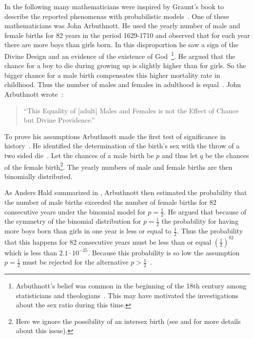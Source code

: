In the following many mathematicians were inspired by Graunt's book to describe the reported phenomenas with probabilistic models~\cite[p. 275]{hald1}. One of these mathematicians was John Arbuthnott. He used the yearly number of male and female births for 82 years in the period 1629-1710 and observed that for each year there are more boys than girls born. In this disproportion he saw a sign of the Divine Design and an evidence of the existence of God~\cite[p. 277]{hald1}\footnote{Arbuthnott's belief was common in the beginning of the 18th century among statisticians and theologians~\cite[p.~285]{hald1}. This may have motivated the investigations about the sex ratio during this time.}. He argued that the chance for a boy to die during growing up is slightly higher than for girls. So the bigger chance for a male birth compensates this higher mortality rate in childhood. Thus the number of males and females in adulthood is equal~\cite[p. 277]{hald1}. John Arbuthnott wrote~\cite[p. 275]{hald1}:

\begin{quote}
    ``This Equality of [adult] Males and Females is not the Effect of Chance but Divine Providence.''
\end{quote}

To prove his assumptions Arbuthnott made the first test of significance in history~\cite[p. 276]{hald1}. He identified the determination of the birth's sex with the throw of a two sided die~\cite[pp. 275-276]{hald1}. Let the chances of a male birth be $p$ and thus let $q$ be the chances of the female birth\footnote{Here we ignore the possibility of an intersex birth (see \cite{wiki:intersex} and \cite{wiki:transgender} for more details about this issue).}. The yearly numbers of male and female births are then binomially distributed.

As Anders Hald summarized in \cite[p. 278]{hald1}, Arbuthnott then estimated the probability that the number of male births exceeded the number of female births for 82 consecutive years under the binomial model for $p=\tfrac 12$. He argued that because of the symmetry of the binomial distribution for $p=\tfrac 12$ the probability for having more boys born than girls in one year is less or equal to $\tfrac 12$. Thus the probability that this happens for 82 consecutive years must be less than or equal $\left(\tfrac 12\right)^{82}$ which is less than $2.1\cdot 10^{-25}$. Because this probability is so low the assumption $p=\tfrac 12$ must be rejected for the alternative $p > \tfrac 12$~\cite[p. 278]{hald1}.

